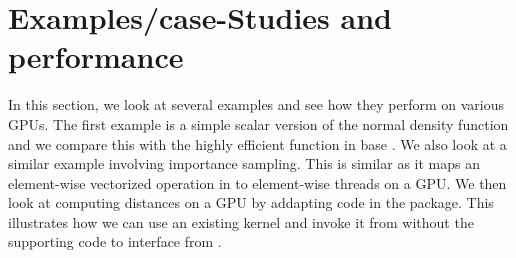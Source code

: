 \section{Examples/case-Studies and performance}\label{sec:}
% 
In this section, we look at several examples and see how they perform
on various GPUs.  The first example is a simple scalar version of the
normal density function and we compare this with the highly efficient
 function in base \R.  We also look at a similar example
involving importance sampling.  This is similar as it maps an
element-wise vectorized operation in \R{} to element-wise threads on a
GPU.  We then look at computing distances on a GPU by addapting code
in the  package.  This illustrates how we can use an
existing kernel and invoke it from \R{} without the supporting \C{}
code to interface from \R.






